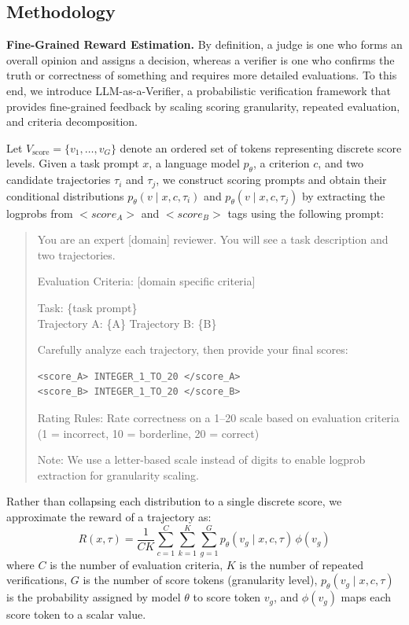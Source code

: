 \subsection{Methodology}
\textbf{Fine-Grained Reward Estimation.} By definition, a judge is one who forms an overall opinion and assigns a decision, whereas a verifier is one who confirms the truth or correctness of something and requires more detailed evaluations. To this end, we introduce LLM-as-a-Verifier, a probabilistic verification framework that provides fine-grained feedback by scaling scoring granularity, repeated evaluation, and criteria decomposition. 

Let $V_{\text{score}} = \{v_1, \ldots, v_G\}$ denote an ordered set of tokens representing discrete score levels. Given a task prompt $x$, a language model $p_\theta$, a criterion $c$, and two candidate trajectories $\tau_i$ and $\tau_j$, we construct scoring prompts and obtain their conditional distributions $p_{\theta}(v \mid x,c,\tau_i)$ and $p_{\theta}(v \mid x, c, \tau_j)$ by extracting the logprobs from $<score_A>$ and $<score_B>$ tags using the following prompt:
\begin{quote}
\small
\ttfamily
You are an expert [domain] reviewer. You will see a task description and two trajectories.

Evaluation Criteria: [domain specific criteria]

Task: \{task prompt\} \\
Trajectory A: \{A\} Trajectory B: \{B\}

Carefully analyze each trajectory, then provide your final scores:
\begin{verbatim}
<score_A> INTEGER_1_TO_20 </score_A>
<score_B> INTEGER_1_TO_20 </score_B>
\end{verbatim}

Rating Rules: Rate correctness on a 1--20 scale based on evaluation criteria (1 = incorrect, 10 = borderline, 20 = correct)

Note: We use a letter-based scale instead of digits to enable logprob extraction for granularity scaling. 
\end{quote}

Rather than collapsing each distribution to a single discrete score, we approximate the reward of a trajectory as:
\begin{equation}
R(x, \tau)
= \frac{1}{CK} \sum_{c=1}^{C} \sum_{k=1}^{K}
\sum_{g=1}^{G} p_{\theta}(v_g \mid x, c, \tau)\,\phi(v_g)
\label{eq:main}
\end{equation}
where $C$ is the number of evaluation criteria, $K$ is the number of repeated verifications, $G$ is the number of score tokens (granularity level), $p_{\theta}(v_g \mid x, c, \tau)$ is the probability assigned by model $\theta$ to score token $v_g$, and $\phi(v_g)$ maps each score token to a scalar value. 


